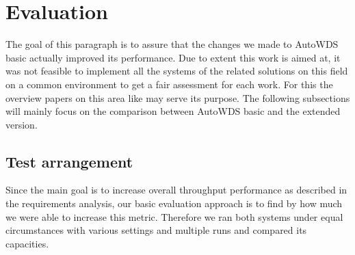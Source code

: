 \chapter{Evaluation}
The goal of this paragraph is to assure that the changes we made to AutoWDS basic actually improved its performance.
Due to extent this work is aimed at, it was not feasible to implement all the systems of the related solutions on this field on a common environment
to get a fair assessment for each work. For this the overview papers on this area like \cite{overview_caa} may serve its purpose.
The following subsections will mainly focus on the comparison between AutoWDS basic and the extended version.
\section{Test arrangement}
Since the main goal is to increase overall throughput performance as described in the requirements analysis, our basic evaluation approach is
to find by how much we were able to increase this metric. Therefore we ran both systems under equal circumstances with various settings and multiple runs
and compared its capacities.
